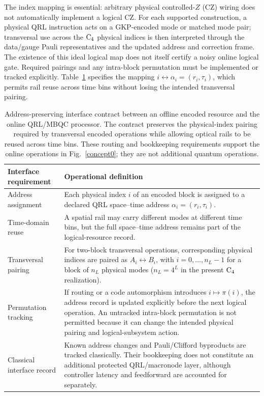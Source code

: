 \documentclass[aps,
prx,
superscriptaddress,
reprint,
longbibliography,
floatfix]{revtex4-2}
\begin{document}
The index mapping is essential: arbitrary physical controlled-$Z$ (CZ) wiring does not automatically implement a logical CZ.
For each supported construction, a physical QRL instruction acts on a GKP-encoded mode or matched mode pair; transversal use across the ${\rm C_4}$ physical indices is then interpreted through the data/gauge Pauli representatives and the updated address and correction frame. The existence of this ideal logical map does not itself certify a noisy online logical gate. Required pairings and any intra-block permutation must be implemented or tracked explicitly. Table~\ref{tab:address_interface} specifies the mapping $i\leftrightarrow\alpha_i=(r_i,\tau_i)$, which permits rail reuse across time bins without losing the intended transversal pairing.

\begin{table}[t]
\centering
\small
\renewcommand{\arraystretch}{1.15}
\setlength{\tabcolsep}{7pt}
\begin{tabular*}{\textwidth}{@{\extracolsep{\fill}}p{}p{}}
\toprule
Interface requirement & Operational definition \\
\midrule
Address assignment & Each physical index $i$ of an encoded block is assigned to a declared QRL space--time address $\alpha_i=(r_i,\tau_i)$. \\
Time-domain reuse & A spatial rail may carry different modes at different time bins, but the full space--time address remains part of the logical-resource record. \\
Transversal pairing & For two-block transversal operations, corresponding physical indices are paired as $A_i\leftrightarrow B_i$, with $i=0,\ldots,n_L-1$ for a block of $n_L$ physical modes ($n_L=4^L$ in the present ${\rm C_4}$ realization). \\
Permutation tracking & If routing or a code automorphism introduces $i\mapsto\pi(i)$, the address record is updated explicitly before the next logical operation. An untracked intra-block permutation is not permitted because it can change the intended physical pairing and logical-subsystem action. \\
Classical interface record & Known address changes and Pauli/Clifford byproducts are tracked classically. Their bookkeeping does not constitute an additional protected QRL/macronode layer, although controller latency and feedforward are accounted for separately. \\
\bottomrule
\end{tabular*}
\caption{Address-preserving interface contract between an offline encoded resource and the online QRL/MBQC processor. The contract preserves the physical-index pairing required by transversal encoded operations while allowing optical rails to be reused across time bins. These routing and bookkeeping requirements support the online operations in Fig.~\ref{concept0}; they are not additional quantum operations.}
\label{tab:address_interface}
\end{table}
\end{document}
